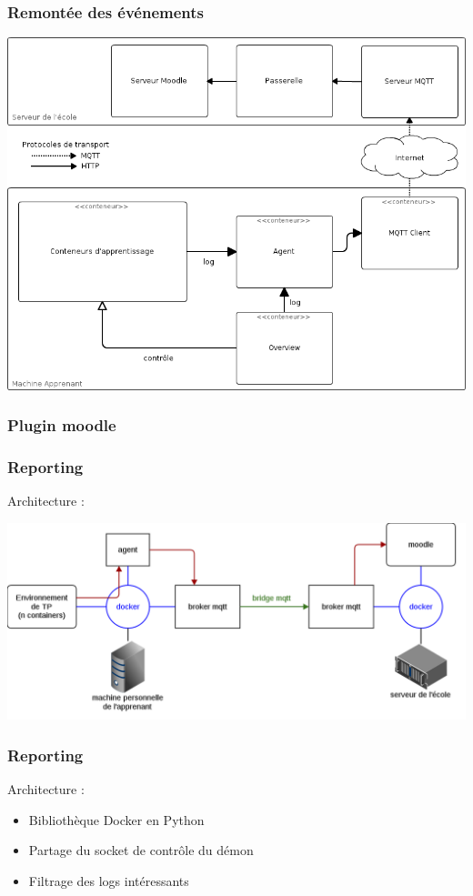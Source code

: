 \documentclass[10pt, compress]{beamer}
\begin{document}
\begin{frame}[fragile]
  \frametitle{Remontée des événements}
  \begin{center}
  \includegraphics[scale = 0.32]{architecture.png}
   \end{center}
\end{frame}

\begin{frame}[fragile]
  \frametitle{Plugin moodle}
  \begin{center}

   \end{center}
\end{frame}

\begin{frame}[fragile]
  \frametitle{Reporting}
  Architecture :
   \begin{center}
  \includegraphics[scale = 0.3]{reporting.png}
   \end{center}
\end{frame}

\begin{frame}[fragile]
  \frametitle{Reporting}
  Architecture :
   \begin{itemize}[<+- | alert@+>]
      \item Bibliothèque Docker en Python
      \item Partage du socket de contrôle du démon
      \item Filtrage des logs intéressants
    \end{itemize}
\end{frame}
\end{document}
